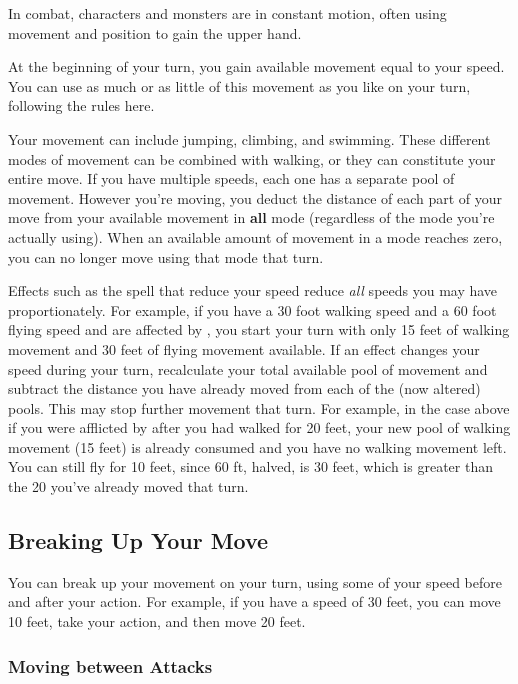 In combat, characters and monsters are in constant motion, often using movement and position to gain the upper hand.

At the beginning of your turn, you gain available movement equal to your speed. You can use as much or as little of this movement as you like on your turn, following the rules here.

Your movement can include jumping, climbing, and swimming. These different modes of movement can be combined with walking, or they can constitute your entire move. If you have multiple speeds, each one has a separate pool of movement. However you're moving, you deduct the distance of each part of your move from your available movement in \textbf{all} mode (regardless of the mode you're actually using). When an available amount of movement in a mode reaches zero, you can no longer move using that mode that turn.

Effects such as the  spell that reduce your speed reduce \textit{all} speeds you may have proportionately. For example, if you have a 30 foot walking speed and a 60 foot flying speed and are affected by , you start your turn with only 15 feet of walking movement and 30 feet of flying movement available. If an effect changes your speed during your turn, recalculate your total available pool of movement and subtract the distance you have already moved from each of the (now altered) pools. This may stop further movement that turn. For example, in the case above if you were afflicted by  after you had walked for 20 feet, your new pool of walking movement (15 feet) is already consumed and you have no walking movement left. You can still fly for 10 feet, since 60 ft, halved, is 30 feet, which is greater than the 20 you've already moved that turn.

\subsection{Breaking Up Your Move}

You can break up your movement on your turn, using some of your speed before and after your action. For example, if you have a speed of 30 feet, you can move 10 feet, take your action, and then move 20 feet.

\subsubsection{Moving between Attacks}

